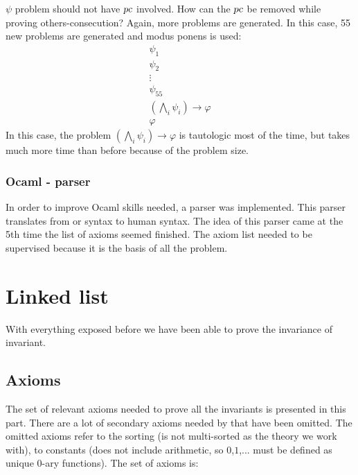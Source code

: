 $\psi$ \spass problem should not have $pc$ involved. How can the $pc$ be removed while proving others-consecution?
%
Again, more \spass problems are generated. 
%
In this case, 55 new problems are generated and modus ponens is used:
\[
	\begin{array}{c}
		\psi_1\\
		\psi_2\\
		\vdots\\
		\psi_{55}\\
		(\bigwedge_i \psi_i) \to \varphi\\\hline
		\varphi
	\end{array}
\]
In this case, the \spass problem $(\bigwedge_i \psi_i) \to \varphi$ is tautologic most of the time, but \spass takes much more time than before because of the problem size.




\subsubsection{Ocaml - parser}
In order to improve Ocaml skills needed, a parser was implemented. 
%
This parser translates from \spass or \leap syntax to human syntax. 
%
The idea of this parser came at the 5th time the list of axioms seemed finished. 
%
The axiom list needed to be supervised because it is the basis of all the problem. 





\section{Linked list}
\label{proof:Preserve}

With everything exposed before we have been able to prove the invariance of \invPreserve invariant.
%


\subsection{Axioms}

The set of relevant axioms needed to prove all the invariants is presented in this part.
%
There are a lot of secondary axioms needed by \spass that have been omitted. 
%
The omitted axioms refer to the sorting (\spass is not multi-sorted as the theory we work with), to constants (\spass does not include arithmetic, so $0$,$1$,... must be defined as unique 0-ary functions). 
%
The set of axioms is:
		
\begin{description}

\end{description}

